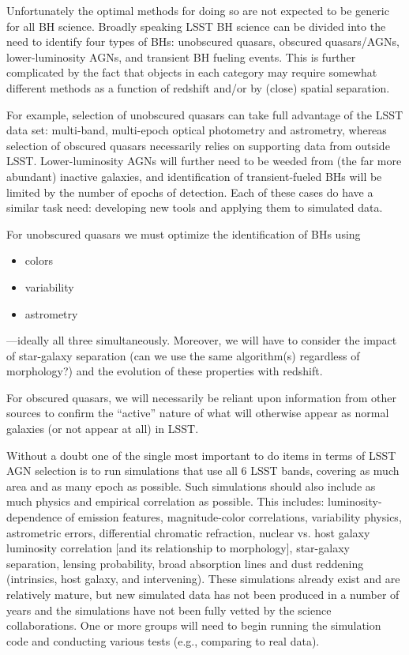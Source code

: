 Unfortunately the optimal methods for doing so are not expected to be
generic for all BH science.  Broadly speaking LSST BH science can be
divided into the need to identify four types of BHs: unobscured
quasars, obscured quasars/AGNs, lower-luminosity AGNs, and transient BH
fueling events.  This is further complicated by the fact that objects
in each category may require somewhat different methods as a function
of redshift and/or by (close) spatial separation.

For example, selection of unobscured quasars can take full advantage
of the LSST data set: multi-band, multi-epoch optical photometry and
astrometry, whereas selection of obscured quasars necessarily relies
on supporting data from outside LSST.  Lower-luminosity AGNs will
further need to be weeded from (the far more abundant) inactive
galaxies, and identification of transient-fueled BHs will be limited
by the number of epochs of detection.  Each of these cases do have a
similar task need: developing new tools and applying them to simulated
data.

For unobscured quasars we must optimize the identification of BHs using
\begin{itemize}
\item colors
\item variability
\item astrometry
\end{itemize}
---ideally all three simultaneously.  Moreover, we will have to
consider the impact of star-galaxy separation (can we use the same
algorithm(s) regardless of morphology?) and the evolution of these
properties with redshift.

For obscured quasars, we will necessarily be reliant upon information
from other sources to confirm the ``active'' nature of what will
otherwise appear as normal galaxies (or not appear at all) in LSST.

Without a doubt one of the single most important to do items in terms of LSST AGN selection is to run simulations that use all 6 LSST bands, covering as much area and as many epoch as possible.  Such simulations should also include as much physics and empirical correlation as possible.  This includes: luminosity-dependence of emission features, magnitude-color correlations, variability physics, astrometric errors, differential chromatic refraction, nuclear vs. host galaxy luminosity correlation [and its relationship to morphology], star-galaxy separation, lensing probability, broad absorption lines and dust reddening (intrinsics, host galaxy, and intervening).  These simulations already exist and are relatively mature, but new simulated data has not been produced in a number of years and the simulations have not been fully vetted by the science collaborations.  One or more groups will need to begin running the simulation code and conducting various tests (e.g., comparing to real data).

